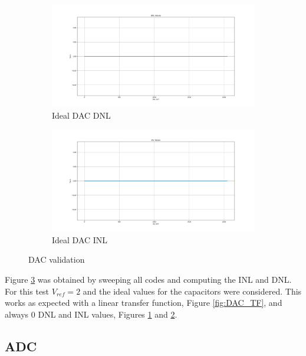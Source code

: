 \begin{figure}[H]
    \begin{subfigure}[b]{0.5\textwidth}
        \centering
        \includegraphics[width=\textwidth]{Images/DAC_DNL_ideal.png}
        \caption{Ideal DAC DNL}
        \label{fig:DAC_DNL}
    \end{subfigure}%
    \begin{subfigure}[b]{0.5\textwidth}
        \centering
        \includegraphics[width=\textwidth]{Images/DAC_INL_ideal.png}
        \caption{Ideal DAC INL}
        \label{fig:DAC_INL}
    \end{subfigure}

    \caption{DAC validation}
    \label{fig:IdealDAC}
\end{figure}

Figure \ref{fig:IdealDAC} was obtained by sweeping all codes and computing the INL and DNL. For this test $V_{ref} = 2$ and the ideal values for the capacitors were considered. This works as expected with a linear transfer function, Figure \ref{fig:DAC_TF}, and always 0 DNL and INL values, Figures \ref{fig:DAC_DNL} and \ref{fig:DAC_INL}.

\subsection{ADC}


